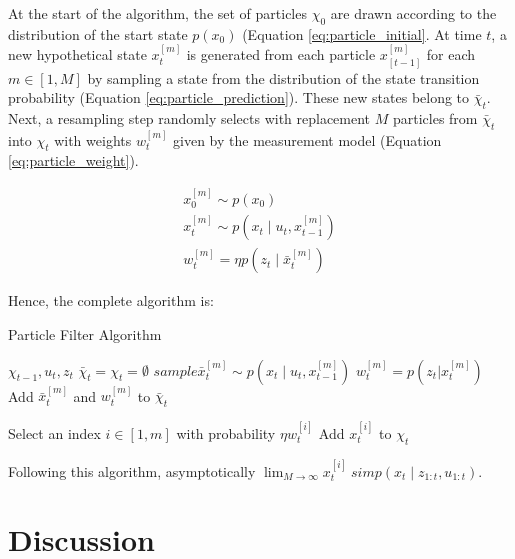 \documentclass[english]{article}
\begin{document}
At the start of the algorithm, the set of particles $\chi_0$ are drawn according to the distribution of the start state $p(x_0)$ (Equation \ref{eq:particle_initial}. At time $t$, a new hypothetical state $x^{[m]}_t$ is generated from each particle $x^{[m]}_{[t-1]}$ for each $m \in [1,M]$ by sampling a state from the distribution of the state transition probability (Equation \ref{eq:particle_prediction}). These new states belong to $\bar{\chi}_t$. Next, a resampling step randomly selects with replacement $M$ particles from $\bar{\chi}_t$ into $\chi_t$ with weights $w^{[m]}_t$ given by the measurement model (Equation \ref{eq:particle_weight}).

\begin {align}
  x^{[m]}_0 \sim  p(x_0) \label{eq:particle_initial}\\
  x^{[m]}_t \sim p(x_t \mid u_t,x^{[m]}_{t-1}) \label{eq:particle_prediction} \\
  w^{[m]}_t = \eta p(z_t \mid \bar{x}^{[m]}_t) \label{eq:particle_weight}
\end {align}

Hence, the complete algorithm is:
\begin{algorithm}
\caption{Particle Filter Algorithm}
\label{alg:particla}
\begin{algorithmic}
	\REQUIRE $\chi_{t-1}, u_t, z_t$
        \STATE $\bar{\chi}_t = \chi_t = \emptyset$
        \STATE $sample \bar{x}^{[m]}_t \sim p(x_t \mid u_t,x^{[m]}_{t-1})$
        \STATE $w^{[m]}_t = p(z_t | x^{[m]}_t)$
        \STATE Add $\bar{x}^{[m]}_t$ and $w^{[m]}_t$ to $\bar{\chi}_t$
        \ENDFOR

        \STATE Select an index $i \in [1,m]$ with probability $\eta w^{[i]}_t$
        \STATE Add $x^{[i]}_t$ to $\chi_t$
        \ENDFOR

\end{algorithmic}
\end{algorithm}


Following this algorithm, asymptotically $\lim_{M \to \infty} x^{[i]}_t \ sim p(x_t \mid z_{1:t}, u_{1:t})$.



\section*{Discussion}



\end{document}
